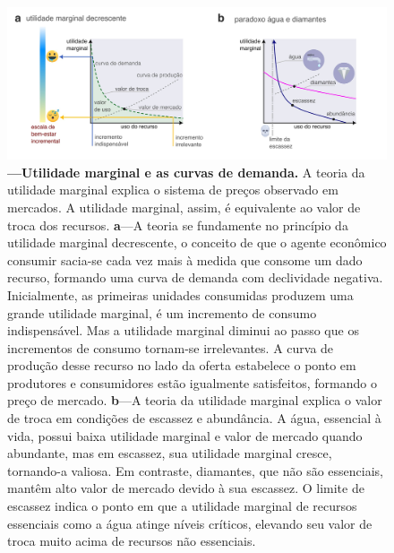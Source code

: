 \documentclass[./main.tex]{subfiles}
\begin{document}
\begin{figure}[t!] 
\centering				
\includegraphics[width=0.98\linewidth]{figs/fig_marginalutil.jpg}		
\caption[Utilidade marginal e as curvas de demanda]
{\textbf{---\;Utilidade marginal e as curvas de demanda.}
    A teoria da utilidade marginal explica o sistema de preços observado em mercados. A utilidade marginal, assim, é equivalente ao valor de troca dos recursos. 
    \;\textbf{a}\;---\;A teoria se fundamente no princípio da utilidade marginal decrescente, o conceito de que o agente econômico consumir sacia-se cada vez mais à medida que consome um dado recurso, formando uma curva de demanda com declividade negativa. Inicialmente, as primeiras unidades consumidas produzem uma grande utilidade marginal, é um incremento de consumo indispensável. Mas a utilidade marginal diminui ao passo que os incrementos de consumo tornam-se irrelevantes. A curva de produção desse recurso no lado da oferta estabelece o ponto em produtores e consumidores estão igualmente satisfeitos, formando o preço de mercado.
    \;\textbf{b}\;---\;A teoria da utilidade marginal explica o valor de troca em condições de escassez e abundância. A água, essencial à vida, possui baixa utilidade marginal e valor de mercado quando abundante, mas em escassez, sua utilidade marginal cresce, tornando-a valiosa. Em contraste, diamantes, que não são essenciais, mantêm alto valor de mercado devido à sua escassez. O limite de escassez indica o ponto em que a utilidade marginal de recursos essenciais como a água atinge níveis críticos, elevando seu valor de troca muito acima de recursos não essenciais.
}
\label{fig:eco:marginutil} 		
\end{figure}
\end{document}
